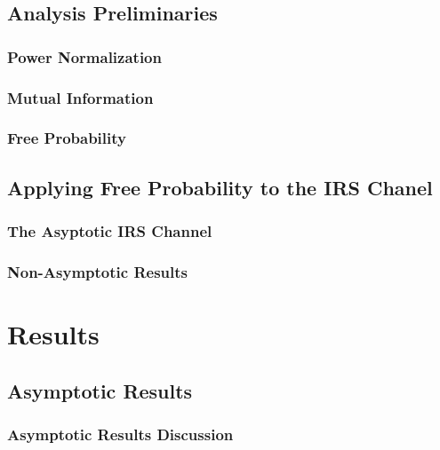 \documentclass[12pt,a4paper]{report}
\begin{document}
\section{Analysis Preliminaries}
\subsection{Power Normalization}

\subsection{Mutual Information}\label{sectiond:mut_info}

\subsection{Free Probability}\label{Free_Prob_Intro}

\section{Applying Free Probability to the IRS Chanel}
\subsection{The Asyptotic IRS Channel}

\subsection{Non-Asymptotic Results}

\chapter{Results}\label{Results}
\section{Asymptotic Results}
\subsection{Asymptotic Results Discussion}
\end{document}

